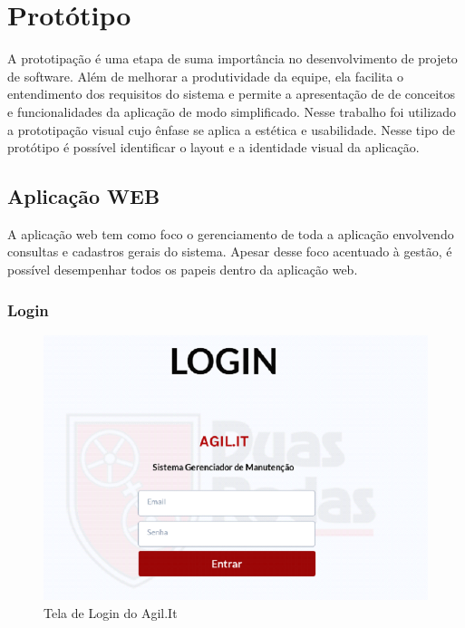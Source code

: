 \chapter{Protótipo}
A prototipação é uma etapa de suma importância no desenvolvimento de projeto de software. Além de melhorar a produtividade da equipe, ela facilita o entendimento dos requisitos do sistema e permite a apresentação de de conceitos e funcionalidades da aplicação de modo simplificado.
Nesse trabalho foi utilizado a prototipação visual cujo ênfase se aplica a estética e usabilidade. Nesse tipo de protótipo é possível identificar o layout e a identidade visual da aplicação. \cite{dextra2013prototipacao}

\section{Aplicação WEB}
A aplicação web tem como foco o gerenciamento de toda a aplicação envolvendo consultas e cadastros gerais do sistema.
Apesar desse foco acentuado à gestão, é possível desempenhar todos os papeis dentro da aplicação web.

\newpage
\subsection{Login}

\begin{figure}[htb]
	\caption{\label{web_login}Tela de Login do Agil.It}
	\begin{center}
		\includegraphics[scale=0.70]{./Figuras/web/login.png}
	\end{center}
\end{figure}

